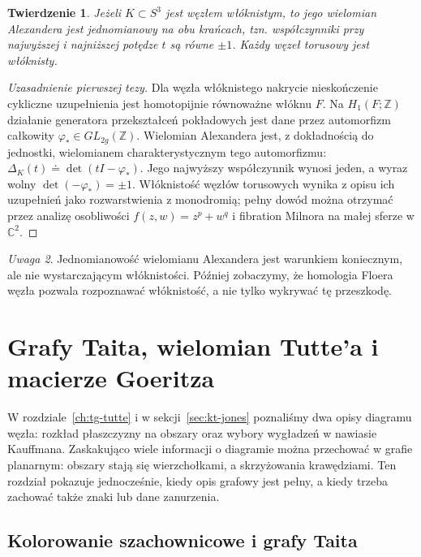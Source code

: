 \documentclass[11pt,a4paper]{report}
\numberwithin{equation}{section}
\theoremstyle{plain}
\newtheorem{twierdzenie}{Twierdzenie}[section]
\theoremstyle{definition}
\theoremstyle{remark}
\newtheorem{uwaga}[twierdzenie]{Uwaga}
\begin{document}
\begin{twierdzenie}
Jeżeli $K\subset S^3$ jest węzłem włóknistym, to jego
wielomian Alexandera jest jednomianowy na obu krańcach,
tzn. współczynniki przy najwyższej i najniższej potędze
$t$ są równe $\pm1$. Każdy węzeł torusowy jest włóknisty.
\end{twierdzenie}

\begin{proof}[Uzasadnienie pierwszej tezy]
Dla węzła włóknistego nakrycie nieskończenie cykliczne
uzupełnienia jest homotopijnie równoważne włóknu $F$.
Na $H_1(F;\mathbb Z)$ działanie generatora przekształceń
pokładowych jest dane przez automorfizm całkowity
$\varphi_*\in GL_{2g}(\mathbb Z)$. Wielomian Alexandera
jest, z dokładnością do jednostki, wielomianem
charakterystycznym tego automorfizmu:
$\Delta_K(t)\doteq\det(tI-\varphi_*)$.
Jego najwyższy współczynnik wynosi jeden, a wyraz wolny
$\det(-\varphi_*)=\pm1$. Włóknistość węzłów torusowych
wynika z opisu ich uzupełnień jako rozwarstwienia z monodromią;
pełny dowód można otrzymać przez analizę osobliwości
$f(z,w)=z^p+w^q$ i fibration Milnora na małej sferze
w $\mathbb C^2$.
\end{proof}

\begin{uwaga}
Jednomianowość wielomianu Alexandera jest warunkiem koniecznym,
ale nie wystarczającym włóknistości. Później zobaczymy, że
homologia Floera węzła pozwala rozpoznawać włóknistość,
a nie tylko wykrywać tę przeszkodę.
\end{uwaga}



\chapter{Grafy Taita, wielomian Tutte'a i macierze Goeritza}
\label{ch:tg-tait-goeritz}

W rozdziale~\ref{ch:tg-tutte} i w sekcji~\ref{sec:kt-jones}
poznaliśmy dwa opisy diagramu węzła: rozkład płaszczyzny
na obszary oraz wybory wygładzeń w nawiasie Kauffmana.
Zaskakująco wiele informacji o diagramie można przechować
w grafie planarnym: obszary stają się wierzchołkami,
a skrzyżowania krawędziami. Ten rozdział pokazuje
jednocześnie, kiedy opis grafowy jest pełny, a kiedy
trzeba zachować także znaki lub dane zanurzenia.

\section{Kolorowanie szachownicowe i grafy Taita}
\label{sec:tg-tait-def}
\end{document}
